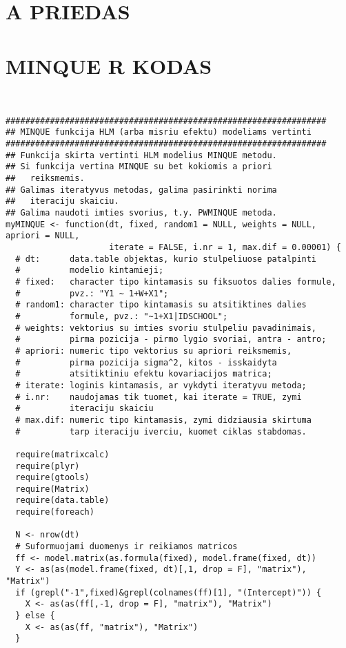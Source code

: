 \documentclass[11pt,a4paper]{article}
\begin{document}
\newpage
\begin{appendix}

 \hypertarget{appendixa}{\section*{A PRIEDAS}}
\section*{MINQUE R KODAS}

\begin{small}
\begin{verbatim}


#################################################################
## MINQUE funkcija HLM (arba misriu efektu) modeliams vertinti
#################################################################
## Funkcija skirta vertinti HLM modelius MINQUE metodu. 
## Si funkcija vertina MINQUE su bet kokiomis a priori 
##   reiksmemis.
## Galimas iteratyvus metodas, galima pasirinkti norima 
##   iteraciju skaiciu.
## Galima naudoti imties svorius, t.y. PWMINQUE metoda.
myMINQUE <- function(dt, fixed, random1 = NULL, weights = NULL, apriori = NULL,
                     iterate = FALSE, i.nr = 1, max.dif = 0.00001) {
  # dt:      data.table objektas, kurio stulpeliuose patalpinti 
  #          modelio kintamieji;
  # fixed:   character tipo kintamasis su fiksuotos dalies formule,
  #          pvz.: "Y1 ~ 1+W+X1";
  # random1: character tipo kintamasis su atsitiktines dalies
  #          formule, pvz.: "~1+X1|IDSCHOOL";
  # weights: vektorius su imties svoriu stulpeliu pavadinimais,
  #          pirma pozicija - pirmo lygio svoriai, antra - antro;
  # apriori: numeric tipo vektorius su apriori reiksmemis,
  #          pirma pozicija sigma^2, kitos - isskaidyta 
  #          atsitiktiniu efektu kovariacijos matrica;
  # iterate: loginis kintamasis, ar vykdyti iteratyvu metoda;
  # i.nr:    naudojamas tik tuomet, kai iterate = TRUE, zymi
  #          iteraciju skaiciu
  # max.dif: numeric tipo kintamasis, zymi didziausia skirtuma
  #          tarp iteraciju iverciu, kuomet ciklas stabdomas.
  
  require(matrixcalc)
  require(plyr)
  require(gtools)
  require(Matrix)
  require(data.table)
  require(foreach)
  
  N <- nrow(dt)
  # Suformuojami duomenys ir reikiamos matricos
  ff <- model.matrix(as.formula(fixed), model.frame(fixed, dt))
  Y <- as(as(model.frame(fixed, dt)[,1, drop = F], "matrix"), "Matrix")
  if (grepl("-1",fixed)&grepl(colnames(ff)[1], "(Intercept)")) {
    X <- as(as(ff[,-1, drop = F], "matrix"), "Matrix")
  } else {
    X <- as(as(ff, "matrix"), "Matrix")
  }
  

\end{verbatim}
\end{small}
\end{appendix}
\end{document}
